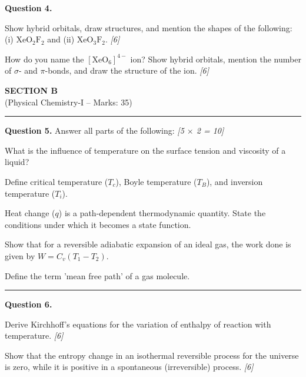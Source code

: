 \documentclass[11pt,a4paper]{article}
\newcommand{\pts}[1]{\hfill   \textit{[#1]}}
\begin{document}
\noindent   \textbf{Question 4.}

\begin{parts}
  \item Show hybrid orbitals, draw structures, and mention the shapes of the following: (i) $ \text{XeO}_2 \text{F}_2$ and (ii) $ \text{XeO}_3 \text{F}_2$. \pts{6}
  \item How do you name the $[ \text{XeO}_6]^{4-}$ ion? Show hybrid orbitals, mention the number of $\sigma$- and $\pi$-bonds, and draw the structure of the ion. \pts{6}
\end{parts}


\newpage

\begin{center}
  {\large\bfseries SECTION B}\\[2pt]
  {\normalsize (Physical Chemistry-I -- Marks: 35)}
\end{center}
\rule{0.4\linewidth}{0.2pt}
\smallskip




\noindent   \textbf{Question 5.} Answer all parts of the following: \pts{5 $ \times$ 2 = 10}

\begin{parts}
  \item What is the influence of temperature on the surface tension and viscosity of a liquid?
  \item Define critical temperature ($T_c$), Boyle temperature ($T_B$), and inversion temperature ($T_i$).
  \item Heat change ($q$) is a path-dependent thermodynamic quantity. State the conditions under which it becomes a state function.
  \item Show that for a reversible adiabatic expansion of an ideal gas, the work done is given by $W = C_v(T_1 - T_2)$.
  \item Define the term 'mean free path' of a gas molecule.
\end{parts}

\medskip\rule{\linewidth}{0.2pt}




\noindent   \textbf{Question 6.}

\begin{parts}
  \item Derive Kirchhoff's equations for the variation of enthalpy of reaction with temperature. \pts{6}
  \item Show that the entropy change in an isothermal reversible process for the universe is zero, while it is positive in a spontaneous (irreversible) process. \pts{6}
\end{parts}
\end{document}
